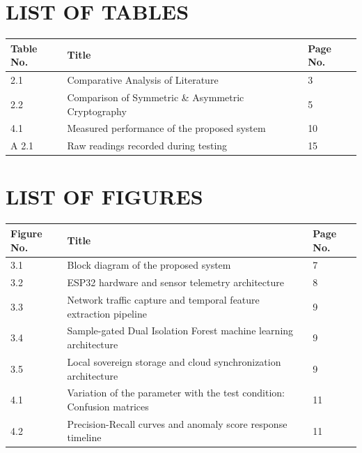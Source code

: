 \documentclass[11pt,a4paper]{report}
\begin{document}
\clearpage

\chapter*{LIST OF TABLES}
\thispagestyle{plain}
\setcounter{page}{5}
\vspace*{-10pt}

\begin{center}
{\small
\begin{tabular}{|p{2.2cm}|p{10.8cm}|p{1.8cm}|}
\hline
\rowcolor{black!10}
\textbf{Table No.} & \textbf{Title} & \textbf{Page No.} \\
\hline
2.1 & Comparative Analysis of Literature & 3 \\
\hline
2.2 & Comparison of Symmetric \& Asymmetric Cryptography & 5 \\
\hline
4.1 & Measured performance of the proposed system & 10 \\
\hline
A 2.1 & Raw readings recorded during testing & 15 \\
\hline
\end{tabular}
}
\end{center}

\clearpage

\chapter*{LIST OF FIGURES}
\thispagestyle{plain}
\setcounter{page}{6}
\vspace*{-10pt}

\begin{center}
{\small
\begin{tabular}{|p{2.2cm}|p{10.8cm}|p{1.8cm}|}
\hline
\rowcolor{black!10}
\textbf{Figure No.} & \textbf{Title} & \textbf{Page No.} \\
\hline
3.1 & Block diagram of the proposed system & 7 \\
\hline
3.2 & ESP32 hardware and sensor telemetry architecture & 8 \\
\hline
3.3 & Network traffic capture and temporal feature extraction pipeline & 9 \\
\hline
3.4 & Sample-gated Dual Isolation Forest machine learning architecture & 9 \\
\hline
3.5 & Local sovereign storage and cloud synchronization architecture & 9 \\
\hline
4.1 & Variation of the parameter with the test condition: Confusion matrices & 11 \\
\hline
4.2 & Precision-Recall curves and anomaly score response timeline & 11 \\
\hline
\end{tabular}
}
\end{center}
\end{document}
